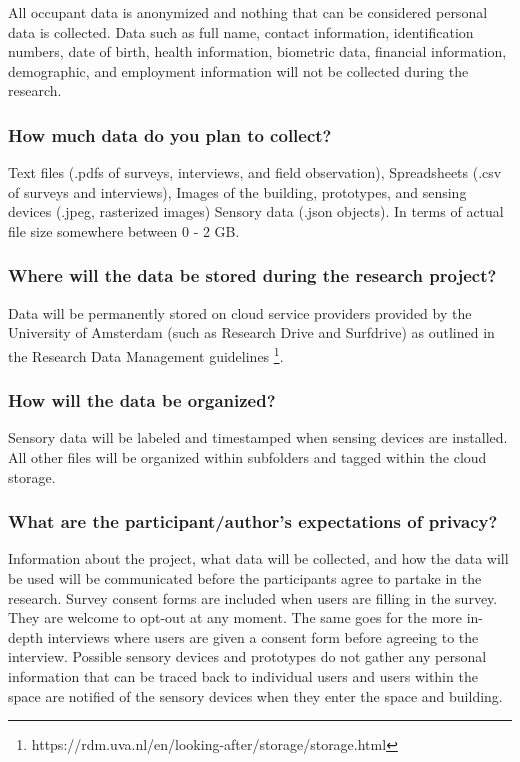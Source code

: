 \documentclass[a4paper]{article}
\begin{document}
All occupant data is anonymized and nothing that can be considered personal data is collected. Data such as full name, contact information, identification numbers, date of birth, health information, biometric data, financial information, demographic, and employment information will not be collected during the research.

\subsubsection{How much data do you plan to collect?}

Text files (.pdfs of surveys, interviews, and field observation), Spreadsheets (.csv of surveys and interviews), Images of the building, prototypes, and sensing devices (.jpeg, rasterized images) Sensory data (.json objects). In terms of actual file size somewhere between 0 - 2 GB.

\subsubsection{Where will the data be stored during the research project?}

Data will be permanently stored on cloud service providers provided by the University of Amsterdam (such as Research Drive and Surfdrive) as outlined in the Research Data Management guidelines \footnote{https://rdm.uva.nl/en/looking-after/storage/storage.html}. 

\subsubsection{How will the data be organized?}
Sensory data will be labeled and timestamped when sensing devices are installed. All other files will be organized within subfolders and tagged within the cloud storage.

\subsubsection{What are the participant/author’s expectations of privacy?}
Information about the project, what data will be collected, and how the data will be used will be communicated before the participants agree to partake in the research. Survey consent forms are included when users are filling in the survey. They are welcome to opt-out at any moment. The same goes for the more in-depth interviews where users are given a consent form before agreeing to the interview. Possible sensory devices and prototypes do not gather any personal information that can be traced back to individual users and users within the space are notified of the sensory devices when they enter the space and building.
\end{document}
